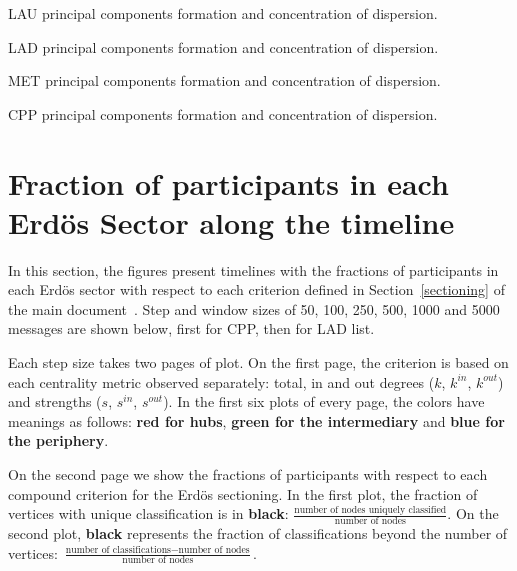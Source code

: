\begin{table}[!h]
	\caption{LAU principal components formation and concentration of dispersion.}
	\footnotesize
	
\label{tab:pcain}
\end{table}
\begin{table}[!h]
	\caption{LAD principal components formation and concentration of dispersion.}
	\footnotesize
	
\label{tab:pcain}
\end{table}
\begin{table}[!h]
	\caption{MET principal components formation and concentration of dispersion.}
	\footnotesize
	
\label{tab:pcain}
\end{table}
\begin{table}[!h]
	\caption{CPP principal components formation and concentration of dispersion.}
	\footnotesize
	
\label{tab:pcain}
\end{table}


\FloatBarrier
\section{Fraction of participants in each Erd\"os Sector along the timeline}\label{si:frac}
In this section, the figures present timelines
with the 
fractions of participants in each Erd\"os sector with respect to each criterion defined in Section~\ref*{sectioning} of the main document~\cite{tpaper}. Step and window sizes of 50, 100, 250, 500, 1000 and 5000 messages are shown below, first for CPP, then for  LAD list.

Each step size takes two pages of plot.
On the first page, the criterion is based on each centrality metric observed separately: total, in and out degrees ($k$, $k^{in}$, $k^{out}$) and strengths ($s$, $s^{in}$, $s^{out}$).
In the first six plots of every page,
the colors have meanings as follows: {\bf \color{red} red for hubs}, {\color{Green}\bf green for the intermediary} and {\bf\color{blue} blue for the periphery}.


On the second page we show the fractions of participants with respect to each compound criterion for the Erd\"os sectioning.
In the first plot, the fraction of vertices with unique classification is in {\bf black}:
$\frac{\text{number of nodes uniquely classified}}{\text{number of nodes}}$.
On the second plot, {\bf black} represents the fraction of classifications beyond the number of vertices:
$\frac{\text{number of classifications} - \text{number of nodes}}{\text{number of nodes}}$.



